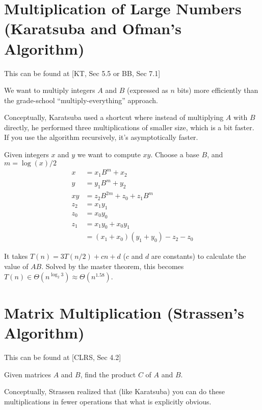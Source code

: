     \section{Multiplication of Large Numbers (Karatsuba and Ofman's Algorithm)}
        This can be found at [KT, Sec 5.5 or BB, Sec 7.1]

        We want to multiply integers $A$ and $B$ (expressed as $n$ bits)
        more efficiently than the grade-school ``multiply-everything'' approach.

        Conceptually, Karatsuba used a shortcut where instead of multiplying
        $A$ with $B$ directly, he performed three multiplications of smaller
        size, which is a bit faster. If you use the algorithm recursively, it's
        asymptotically faster.

        Given integers $x$ and $y$ we want to compute $xy$. Choose a base $B$,
        and $m = \log(x)/2$
        \begin{align*}
            x &= x_1 B^m + x_2 \\
            y &= y_1 B^m + y_2 \\
            xy &= z_2 B^{2m} + z_0 + z_1 B^{m} \\
            z_2 &= x_1 y_1 \\
            z_0 &= x_0 y_0 \\
            z_1 &= x_1 y_0 + x_0 y_1 \\
            &= (x_1 + x_0)(y_1 + y_0) - z_2 - z_0
        \end{align*}

        It takes $T(n) = 3 T(n/2) + cn + d$ ($c$ and $d$ are constants) to
        calculate the value of $AB$. Solved by the master theorem, this becomes
        $T(n) \in \Theta(n^{\log_2{3}}) \approx \Theta(n^1.58)$.

    \section{Matrix Multiplication (Strassen's Algorithm)}
        This can be found at [CLRS, Sec 4.2]

        Given matrices $A$ and $B$, find the product $C$ of $A$ and $B$.

        Conceptually, Strassen realized that (like Karatsuba) you can do these
        multiplications in fewer operations that what is explicitly obvious.

